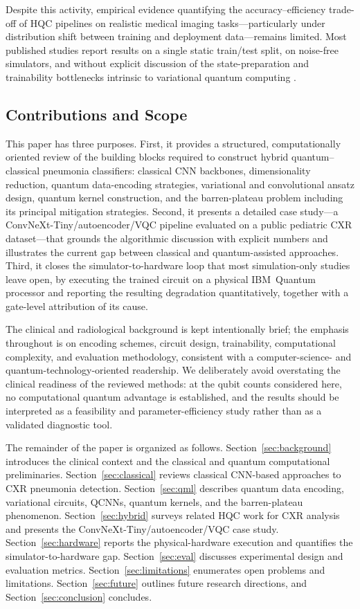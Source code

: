 \documentclass[11pt,a4paper]{article}
\begin{document}
Despite this activity, empirical evidence quantifying the accuracy--efficiency
trade-off of HQC pipelines on realistic medical imaging tasks---particularly
under distribution shift between training and deployment data---remains
limited.  Most published studies report results on a single static
train/test split, on noise-free simulators, and without explicit discussion of
the state-preparation and trainability bottlenecks intrinsic to variational
quantum computing \cite{sharma2023survey}.

\subsection{Contributions and Scope}

This paper has three purposes.  First, it provides a structured,
computationally oriented review of the building blocks required to construct
hybrid quantum--classical pneumonia classifiers: classical CNN backbones,
dimensionality reduction, quantum data-encoding strategies, variational and
convolutional ansatz design, quantum kernel construction, and the
barren-plateau problem including its principal mitigation strategies.  Second,
it presents a detailed case study---a ConvNeXt-Tiny/autoencoder/VQC pipeline
evaluated on a public pediatric CXR dataset---that grounds the algorithmic
discussion with explicit numbers and illustrates the current gap between
classical and quantum-assisted approaches.  Third, it closes the
simulator-to-hardware loop that most simulation-only studies leave open, by
executing the trained circuit on a physical IBM~Quantum processor and reporting
the resulting degradation quantitatively, together with a gate-level
attribution of its cause.

The clinical and radiological background is kept intentionally brief; the
emphasis throughout is on encoding schemes, circuit design, trainability,
computational complexity, and evaluation methodology, consistent with a
computer-science- and quantum-technology-oriented readership.  We deliberately
avoid overstating the clinical readiness of the reviewed methods: at the qubit
counts considered here, no computational quantum advantage is established, and
the results should be interpreted as a feasibility and parameter-efficiency
study rather than as a validated diagnostic tool.

The remainder of the paper is organized as follows.
Section~\ref{sec:background} introduces the clinical context and the classical
and quantum computational preliminaries.  Section~\ref{sec:classical} reviews
classical CNN-based approaches to CXR pneumonia detection.
Section~\ref{sec:qml} describes quantum data encoding, variational circuits,
QCNNs, quantum kernels, and the barren-plateau phenomenon.
Section~\ref{sec:hybrid} surveys related HQC work for CXR analysis and
presents the ConvNeXt-Tiny/autoencoder/VQC case study.
Section~\ref{sec:hardware} reports the physical-hardware execution and
quantifies the simulator-to-hardware gap.
Section~\ref{sec:eval} discusses experimental design and evaluation metrics.
Section~\ref{sec:limitations} enumerates open problems and limitations.
Section~\ref{sec:future} outlines future research directions, and
Section~\ref{sec:conclusion} concludes.
\end{document}
